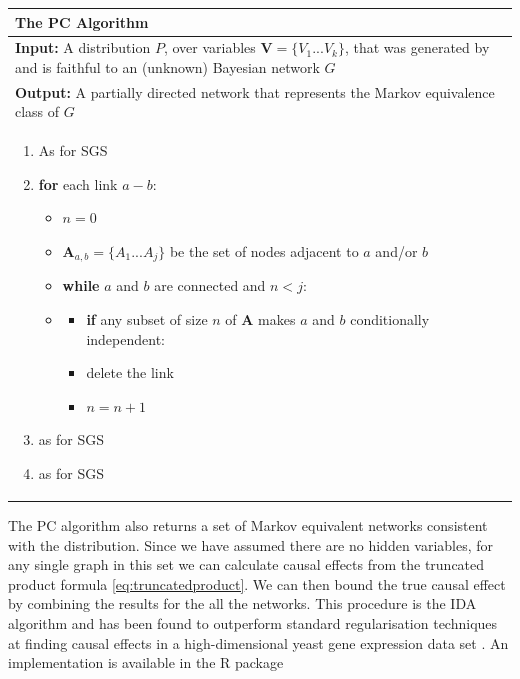 \begin{table}[H]
 \begin{tabularx}{\textwidth}{X}
 \hline
\rule{0pt}{2.5ex} 
 \textbf{The PC Algorithm}\\
 \hline
 \rule{0pt}{2.5ex}
\textbf{Input:} A distribution $P$, over variables $\boldsymbol{V} = \{V_{1}...V_{k}\}$, that was generated by and is faithful to an (unknown) Bayesian network $G$\\
\textbf{Output:} A partially directed network that represents the Markov equivalence class of $G$\\
 \begin{enumerate}[itemsep=8pt]
  \item As for SGS
  \item \textbf{for} each link $a-b$:
  \begin{itemize}[label={}]
   \item $n = 0$
   \item $\boldsymbol{A}_{a,b} = \{A_{1}...A_{j}\}$ be the set of nodes adjacent to $a$ and/or $b$
   \item \textbf{while} $a$ and $b$ are connected and $n < j$:
   \item 
    	\begin{itemize}[label={}]
    	\item \textbf{if} any subset of size $n$ of $\boldsymbol{A}$ makes $a$ and $b$ conditionally independent:
    	\item \begin{itemize}[label={}]
    			delete the link
    		  \end{itemize}
    	
    	\item $n = n+1$
    	\end{itemize}
  \end{itemize}   
  \item as for SGS
  \item as for SGS
\end{enumerate}\\
 \hline
\end{tabularx}
\end{table}

The PC algorithm also returns a set of Markov equivalent networks consistent with the distribution. Since we have assumed there are no hidden variables, for any single graph in this set we can calculate causal effects from the truncated product formula \ref{eq:truncatedproduct}. We can then bound the true causal effect by combining the results for the all the networks. This procedure is the IDA algorithm \citep{Maathuis2009} and has been found to outperform standard regularisation techniques at finding causal effects in a high-dimensional yeast gene expression data set \citep{Maathuis2010}. An implementation is available in the R package \citep{Kalisch2012} 

